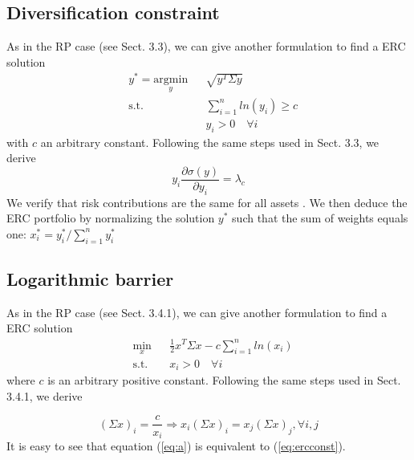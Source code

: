 \subsection{Diversification constraint}
As in the RP case (see Sect. 3.3), we can give another formulation to find a ERC solution
\begin{equation}\label{eq:dc}
\begin{aligned}
& y^* = \underset{y}{\text{argmin}}
&& \sqrt{y^T \Sigma y}\\
& \text{s.t.}
&&\sum_{i=1}^n ln(y_i) \geq c\\
&&&y_i > 0 \hspace{1em} \forall i
\end{aligned}
\end{equation}
with $c$ an arbitrary constant. Following the same steps used in Sect. 3.3, we derive 
\begin{equation}
y_i \frac{\partial\sigma(y)}{\partial y_i} = \lambda_c
\end{equation}
We verify that risk contributions are the same for all assets \cite{erc}. We then deduce the ERC portfolio by normalizing the solution $y^*$ such that the sum of weights equals one: $x_i^* =y_i^*/\sum_{i=1}^n y_i^*$

\subsection{Logarithmic barrier}
As in the RP case (see Sect. 3.4.1), we can give another formulation to find a ERC solution
\begin{equation}
\begin{aligned}
& \underset{x}{\text{min}}
&&\frac{1}{2} x^T \Sigma x - c \sum_{i=1}^{n} ln(x_i)\\
& \text{s.t.}
&& x_i > 0 \hspace{1em} \forall i
\end{aligned}
\end{equation}
where $c$ is an arbitrary positive constant. Following the same steps used in Sect. 3.4.1, we derive

\begin{equation}\label{eq:a}
(\Sigma x)_i = \frac{c}{x_i} \Rightarrow x_i(\Sigma x)_i = x_j(\Sigma x)_j, \forall i,j
\end{equation}
It is easy to see that equation (\ref{eq:a}) is equivalent to (\ref{eq:ercconst}). 

